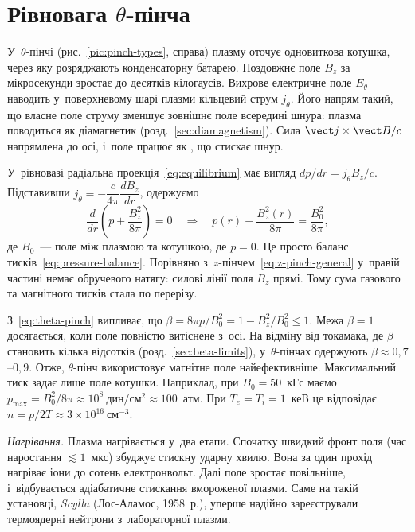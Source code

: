 \section{Рівновага \texorpdfstring{$\theta$}{θ}-пінча}\label{sec:theta-pinch}

У~$\theta$-пінчі (рис.~\ref{pic:pinch-types}, справа) плазму оточує одновиткова котушка,
через яку розряджають конденсаторну батарею. Поздовжнє поле $B_z$ за мікросекунди зростає
до десятків кілогаусів. Вихрове електричне поле $E_\theta$ наводить у~поверхневому шарі
плазми кільцевий струм $j_\theta$. Його напрям такий, що власне поле струму зменшує
зовнішнє поле всередині шнура: плазма поводиться як діамагнетик
(розд.~\ref{sec:diamagnetism}). Сила $\vect j\times\vect B/c$ напрямлена до осі, і~поле
працює як , що стискає шнур.

У~рівновазі радіальна проекція~\eqref{eq:equilibrium} має вигляд $dp/dr=j_\theta B_z/c$.
Підставивши $j_\theta=-\dfrac c{4\pi}\dfrac{dB_z}{dr}$, одержуємо
\begin{equation}\label{eq:theta-pinch}
	\frac{d}{dr}\left(p+\frac{B_z^2}{8\pi}\right)=0\quad\Rightarrow\quad p(r)+\frac{B_z^2(r)}{8\pi}=\frac{B_0^2}{8\pi},
\end{equation}
де $B_0$~--- поле між плазмою та котушкою, де $p=0$. Це просто баланс
тисків~\eqref{eq:pressure-balance}. Порівняно з~$z$-пінчем~\eqref{eq:z-pinch-general}
у~правій частині немає обручевого натягу: силові лінії поля $B_z$ прямі. Тому сума газового
та магнітного тисків стала по перерізу.

З~\eqref{eq:theta-pinch} випливає, що $\beta=8\pi p/B_0^2=1-B_z^2/B_0^2\leqslant1$.
Межа $\beta=1$ досягається, коли поле повністю витіснене з~осі. На відміну від токамака,
де $\beta$ становить кілька відсотків (розд.~\ref{sec:beta-limits}), у~$\theta$-пінчах
одержують $\beta\approx0{,}7$--$0{,}9$. Отже, $\theta$-пінч використовує магнітне поле
найефективніше. Максимальний тиск задає лише поле котушки. Наприклад, при
$B_0=50$~кГс маємо $p_{\max}=B_0^2/8\pi\approx10^8~\mathrm{дин/см^2}\approx100$~атм.
При $T_e=T_i=1$~кеВ це відповідає $n=p/2T\approx3\times10^{16}~\mathrm{см}^{-3}$.

\emph{Нагрівання.} Плазма нагрівається у~два етапи. Спочатку швидкий фронт поля (час
наростання $\lesssim1$~мкс) збуджує стискну ударну хвилю. Вона за один прохід нагріває
іони до сотень електронвольт. Далі поле зростає повільніше, і~відбувається адіабатичне
стискання вмороженої плазми. Саме на такій установці, \emph{Scylla} (Лос-Аламос, 1958~р.),
уперше надійно зареєстрували термоядерні нейтрони з~лабораторної плазми.


